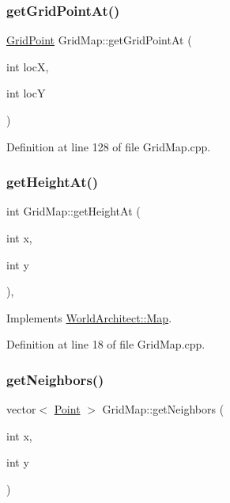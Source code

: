 \subsubsection{\texorpdfstring{getGridPointAt()}{getGridPointAt()}}
{\footnotesize\ttfamily \mbox{\hyperlink{struct_world_architect_1_1_grid_point}{Grid\+Point}} Grid\+Map\+::get\+Grid\+Point\+At (\begin{DoxyParamCaption}\item[{int}]{locX,  }\item[{int}]{locY }\end{DoxyParamCaption})}



Definition at line 128 of file Grid\+Map.\+cpp.

\mbox{\label{class_world_architect_1_1_grid_map_a00b9a9b88ebb3272a1cd2438d1c558ab}} 
\subsubsection{\texorpdfstring{getHeightAt()}{getHeightAt()}}
{\footnotesize\ttfamily int Grid\+Map\+::get\+Height\+At (\begin{DoxyParamCaption}\item[{int}]{x,  }\item[{int}]{y }\end{DoxyParamCaption})\hspace{0.3cm}{\ttfamily [override]}, {\ttfamily [virtual]}}



Implements \mbox{\hyperlink{class_world_architect_1_1_map_ac2f33a10a0d3136515552c171d138ef2}{World\+Architect\+::\+Map}}.



Definition at line 18 of file Grid\+Map.\+cpp.

\mbox{\label{class_world_architect_1_1_grid_map_a353fd3d5ac4bbfe84450814e0e5336bf}} 
\subsubsection{\texorpdfstring{getNeighbors()}{getNeighbors()}}
{\footnotesize\ttfamily vector$<$ \mbox{\hyperlink{namespace_world_architect_afe984ab247ed2917d3a738c7d83d33ca}{Point}} $>$ Grid\+Map\+::get\+Neighbors (\begin{DoxyParamCaption}\item[{int}]{x,  }\item[{int}]{y }\end{DoxyParamCaption})}

